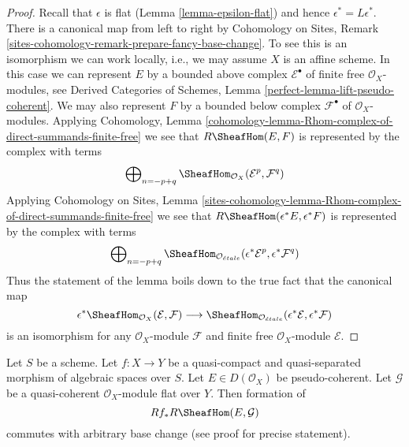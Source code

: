 \begin{proof}
Recall that $\epsilon$ is flat (Lemma \ref{lemma-epsilon-flat}) and
hence $\epsilon^* = L\epsilon^*$. There is a canonical map
from left to right by
Cohomology on Sites, Remark
\ref{sites-cohomology-remark-prepare-fancy-base-change}.
To see this is an isomorphism we can work locally, i.e., we may
assume $X$ is an affine scheme. In this case we can represent
$E$ by a bounded above complex $\mathcal{E}^\bullet$
of finite free $\mathcal{O}_X$-modules, see
Derived Categories of Schemes, Lemma \ref{perfect-lemma-lift-pseudo-coherent}.
We may also represent $F$ by a bounded below complex $\mathcal{F}^\bullet$
of $\mathcal{O}_X$-modules. Applying
Cohomology, Lemma
\ref{cohomology-lemma-Rhom-complex-of-direct-summands-finite-free}
we see that $R\SheafHom(E, F)$ is represented by the complex with terms
$$
\bigoplus\nolimits_{n = - p + q}
\SheafHom_{\mathcal{O}_X}(\mathcal{E}^p, \mathcal{F}^q)
$$
Applying Cohomology on Sites, Lemma
\ref{sites-cohomology-lemma-Rhom-complex-of-direct-summands-finite-free}
we see that $R\SheafHom(\epsilon^*E, \epsilon^*F)$ is represented by the
complex with terms
$$
\bigoplus\nolimits_{n = - p + q}
\SheafHom_{\mathcal{O}_{\acute{e}tale}}
(\epsilon^*\mathcal{E}^p, \epsilon^*\mathcal{F}^q)
$$
Thus the statement of the lemma boils down to the true fact
that the canonical map
$$
\epsilon^*\SheafHom_{\mathcal{O}_X}(\mathcal{E}, \mathcal{F})
\longrightarrow
\SheafHom_{\mathcal{O}_{\acute{e}tale}}
(\epsilon^*\mathcal{E}, \epsilon^*\mathcal{F})
$$
is an isomorphism for any $\mathcal{O}_X$-module $\mathcal{F}$ and
finite free $\mathcal{O}_X$-module $\mathcal{E}$.
\end{proof}

\begin{lemma}
\label{lemma-base-change-RHom}
Let $S$ be a scheme. Let $f : X \to Y$ be a quasi-compact and
quasi-separated morphism of algebraic spaces over $S$.
Let $E \in D(\mathcal{O}_X)$ be pseudo-coherent.
Let $\mathcal{G}$ be a quasi-coherent $\mathcal{O}_X$-module
flat over $Y$. Then formation of
$$
Rf_*R\SheafHom(E, \mathcal{G})
$$
commutes with arbitrary base change (see proof for precise statement).
\end{lemma}

